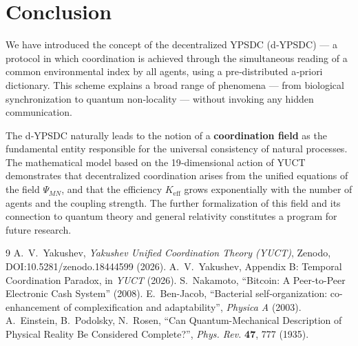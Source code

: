 \documentclass[12pt,a4paper]{article}
\begin{document}
	\section{Conclusion}
	
	We have introduced the concept of the decentralized YPSDC (d‑YPSDC) — a protocol in which coordination is achieved through the simultaneous reading of a common environmental index by all agents, using a pre‑distributed a‑priori dictionary. This scheme explains a broad range of phenomena — from biological synchronization to quantum non‑locality — without invoking any hidden communication.
	
	The d‑YPSDC naturally leads to the notion of a \textbf{coordination field} as the fundamental entity responsible for the universal consistency of natural processes. The mathematical model based on the 19‑dimensional action of YUCT demonstrates that decentralized coordination arises from the unified equations of the field \(\Psi_{MN}\), and that the efficiency \(K_{\mathrm{eff}}\) grows exponentially with the number of agents and the coupling strength. The further formalization of this field and its connection to quantum theory and general relativity constitutes a program for future research.
	
	\begin{thebibliography}{9}
		 A.~V.~Yakushev, \emph{Yakushev Unified Coordination Theory (YUCT)}, Zenodo, DOI:10.5281/zenodo.18444599 (2026).
		 A.~V.~Yakushev, Appendix B: Temporal Coordination Paradox, in \emph{YUCT} (2026).
		 S.~Nakamoto, ``Bitcoin: A Peer-to-Peer Electronic Cash System'' (2008).
		 E.~Ben-Jacob, ``Bacterial self-organization: co-enhancement of complexification and adaptability'', \emph{Physica A} (2003).
		 A.~Einstein, B.~Podolsky, N.~Rosen, ``Can Quantum-Mechanical Description of Physical Reality Be Considered Complete?'', \emph{Phys. Rev.} \textbf{47}, 777 (1935).
	\end{thebibliography}
	
\end{document}
